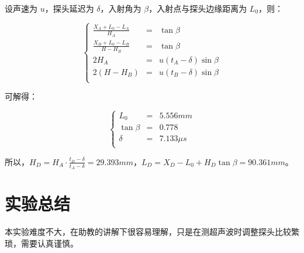 \documentclass[a4paper]{article}
\begin{document}
            \par 设声速为 $u$，探头延迟为 $\delta$，入射角为 $\beta$，入射点与探头边缘距离为 $L_0$，则：

            $$\left\{\begin{array}{rcl}
                \frac{X_A+L_0-L_A}{H_A}&=&\tan\beta\\
                \frac{X_B+L_0-L_B}{H-H_B}&=&\tan\beta\\
                2H_A&=&u(t_A-\delta)\sin\beta\\
                2(H-H_B)&=&u(t_B-\delta)\sin\beta\\
            \end{array}\right.$$

            \par 可解得：

            $$\left\{\begin{array}{rcl}
                L_0&=&5.556mm\\
                \tan\beta&=&0.778\\
                \delta&=&7.133\mu s\\
            \end{array}\right.$$

            \par 所以，$H_D=H_A\cdot\frac{t_D-\delta}{t_A-\delta}=29.393mm$，$L_D=X_D-L_0+H_D\tan\beta=90.361mm$。

\section{实验总结}

    本实验难度不大，在助教的讲解下很容易理解，只是在测超声波时调整探头比较繁琐，需要认真谨慎。
\end{document}
